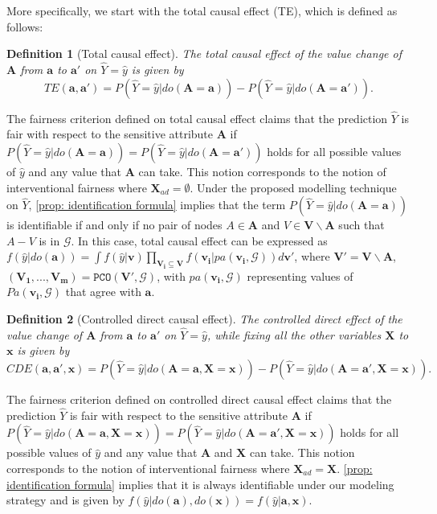 \documentclass{article} %
\newtheorem{definition}{Definition}[section]
\begin{document}
More specifically, we start with the total causal effect (TE), which is defined as follows:
\begin{definition}[Total causal effect]\citep{pearl2009causality}
    The total causal effect of the value change of $\mathbf{A}$ from $\mathbf{a}$ to $\mathbf{a'}$ on $\hat{Y}=\hat{y}$ is given by 
    \begin{equation*}
    TE(\mathbf{a},\mathbf{a'})=P(\hat{Y}=\hat{y}|do(\mathbf{A}=\mathbf{a}))-P(\hat{Y}=\hat{y}|do(\mathbf{A}=\mathbf{a'})).
    \end{equation*}
\end{definition}
The fairness criterion defined on total causal effect claims that the prediction $\hat{Y}$ is fair with respect to the sensitive attribute $\mathbf{A}$ if $P(\hat{Y}=\hat{y}|do(\mathbf{A}=\mathbf{a}))=P(\hat{Y}=\hat{y}|do(\mathbf{A}=\mathbf{a'}))$ holds for all possible values of $\hat{y}$ and any value that $\mathbf{A}$ can take. This notion corresponds to the notion of interventional fairness where $\mathbf{X}_{ad}=\emptyset$. Under the proposed modelling technique on $\hat{Y}$, \cref{prop: identification formula} implies that the term $P(\hat{Y}=\hat{y}|do(\mathbf{A}=\mathbf{a}))$ is identifiable if and only if no pair of nodes $A \in \mathbf{A}$ and $V \in \mathbf{V} \backslash \mathbf{A}$ such that $A - V$ is in $\mathcal{G}$. In this case, total causal effect can be expressed as $f(\hat{y}|do(\mathbf{a})) = \int f(\hat{y}|\mathbf{v}) \prod_{\mathbf{V_i} \subseteq \mathbf{V}} f(\mathbf{v_i}|pa(\mathbf{v_i}, \mathcal{G})) d \mathbf{v'}$, where $\mathbf{V'}= \mathbf{V} \backslash \mathbf{A}$, $(\mathbf{V_1,...,V_m})=\texttt{PCO}(\mathbf{V'}, \mathcal{G})$, with $pa(\mathbf{v_i}, \mathcal{G})$ representing values of $Pa(\mathbf{v_i}, \mathcal{G})$ that agree with $\mathbf{a}$.

\begin{definition}[Controlled direct causal effect]\citep{pearl2009causality}
    The controlled direct effect of the value change of $\mathbf{A}$ from $\mathbf{a}$ to $\mathbf{a'}$ on $\hat{Y}=\hat{y}$, while fixing all the other variables $\mathbf{X}$ to $\mathbf{x}$ is given by 
    \begin{equation*}
        CDE(\mathbf{a},\mathbf{a'}, \mathbf{x})=P(\hat{Y}=\hat{y}|do(\mathbf{A}=\mathbf{a}, \mathbf{X}=\mathbf{x}))-P(\hat{Y}=\hat{y}|do(\mathbf{A}=\mathbf{a'},\mathbf{X}=\mathbf{x})).
    \end{equation*}
\end{definition}
The fairness criterion defined on controlled direct causal effect claims that the prediction $\hat{Y}$ is fair with respect to the sensitive attribute $\mathbf{A}$ if $P(\hat{Y}=\hat{y}|do(\mathbf{A}=\mathbf{a}, \mathbf{X}=\mathbf{x}))=P(\hat{Y}=\hat{y}|do(\mathbf{A}=\mathbf{a'},\mathbf{X}=\mathbf{x}))$ holds for all possible values of $\hat{y}$ and any value that $\mathbf{A}$ and $\mathbf{X}$ can take. This notion corresponds to the notion of interventional fairness where $\mathbf{X}_{ad}=\mathbf{X}$. \cref{prop: identification formula} implies that it is always identifiable under our modeling strategy and is given by $f(\hat{y}|do(\mathbf{a}), do(\mathbf{x}))=f(\hat{y}|\mathbf{a}, \mathbf{x})$.
\end{document}
